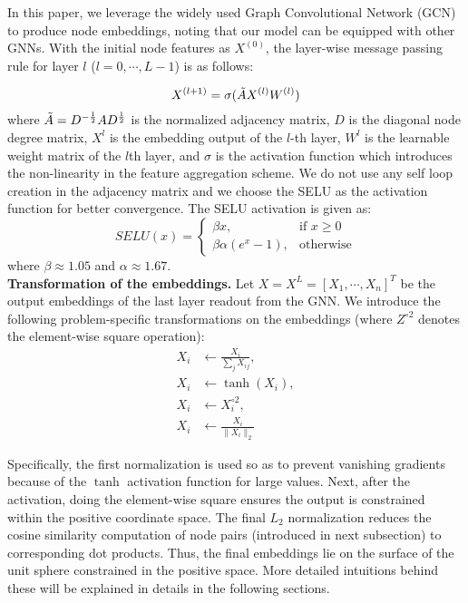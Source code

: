 In this paper, we leverage the widely used Graph Convolutional Network (GCN)~\cite{kipf2016semi} to produce node embeddings, noting that our model can be equipped with other GNNs. With the initial node features as $X^{(0)}$, the layer-wise message passing rule for layer $l$ ($l=0,\cdots, L-1$) is as follows: 

\begin{equation}
    X^{(l+1)}=\sigma ( \Tilde{A} X^{(l)}W^{(l)})
\end{equation}
where $\Tilde{A}=D^{-\frac{1}{2}}AD^{\frac{1}{2}}$ is the normalized adjacency matrix, $D$ is the diagonal node degree matrix, $X^l$ is the embedding output of the $l$-th layer, $W^l$ is the learnable weight matrix of the $l$th layer, and $\sigma$ is the activation function which introduces the non-linearity in the feature aggregation scheme. We do not use any self loop creation in the adjacency matrix and we choose the SELU \cite{klambauer2017self} as the activation function for better convergence. The SELU activation is given as:
\begin{equation}
    SELU(x)=
    \begin{cases}
        \beta x,& \text{if } x \geq 0\\
        \beta \alpha(e^x-1),& \text{otherwise}
    \end{cases}
\end{equation} 
where $\beta \approx 1.05$ and $\alpha \approx 1.67$.\\


\textbf{Transformation of the embeddings. }Let $X=X^{L}=[X_1, \cdots, X_n]^T$ be the output embeddings of the last layer readout from the GNN. We introduce the following problem-specific transformations on the embeddings (where $Z^{\circ 2}$ denotes the element-wise square operation): %
\begin{equation}
 \begin{aligned}
X_i&\leftarrow\frac{X_i}{\sum_j X_{ij}},\\
X_i&\leftarrow\tanh(X_i),\\
 X_i &\leftarrow X_i^{\circ 2},\\
X_i&\leftarrow\frac{X_i}{\|X_i\|_2}    
\end{aligned}   
\end{equation}







Specifically, the first normalization is used so as to prevent vanishing gradients because of the $\tanh$ activation function for large values. Next, after the activation, doing the element-wise square ensures the output is constrained within the positive coordinate space. The final $L_2$ normalization reduces the cosine similarity computation of node pairs (introduced in next subsection) to corresponding dot products. 
Thus, the final embeddings %
lie on the surface of the unit sphere constrained in the positive space. More detailed intuitions behind these will be explained in details in the following sections.\\





